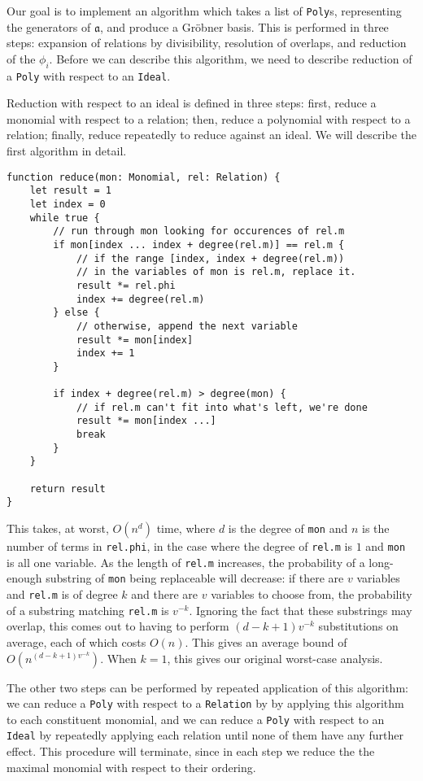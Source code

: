 Our goal is to implement an algorithm which takes a list of \verb|Poly|s, representing the
generators of $\mathfrak{a}$, and produce a Gr\"obner basis. This is performed in three
steps: expansion of relations by divisibility, resolution of overlaps, and reduction
of the $\phi_i$. Before
we can describe this algorithm, we need to describe reduction of a \verb|Poly| with
respect to an \verb|Ideal|.

\begin{alg}
    Reduction with respect to an ideal is defined in three steps: first, reduce
    a monomial with respect to a relation; then, reduce a polynomial with respect
    to a relation; finally, reduce repeatedly to reduce against an ideal. We will
    describe the first algorithm in detail.
\begin{verbatim}
function reduce(mon: Monomial, rel: Relation) {
    let result = 1
    let index = 0
    while true {
        // run through mon looking for occurences of rel.m
        if mon[index ... index + degree(rel.m)] == rel.m {
            // if the range [index, index + degree(rel.m)) 
            // in the variables of mon is rel.m, replace it.
            result *= rel.phi
            index += degree(rel.m)
        } else {
            // otherwise, append the next variable
            result *= mon[index]
            index += 1
        }
        
        if index + degree(rel.m) > degree(mon) {
            // if rel.m can't fit into what's left, we're done
            result *= mon[index ...]
            break
        }
    }
    
    return result
}
\end{verbatim}
    This takes, at worst, $O(n^d)$ time, where $d$ is the
    degree of \verb|mon| and $n$ is the number of terms in \verb|rel.phi|,
    in the case where the degree of \verb|rel.m| is $1$ and \verb|mon| is all one
    variable. As the length of \verb|rel.m| increases, the probability of a long-enough
    substring of \verb|mon| being replaceable will decrease: if there are $v$ variables
    and \verb|rel.m| is of degree $k$ and there are $v$ variables to choose from,
    the probability of a substring matching \verb|rel.m| is $v^{-k}$. Ignoring
    the fact that these substrings may overlap, this comes out to having to perform
    $(d-k+1)v^{-k}$ substitutions on average, each of which costs $O(n)$. This gives
    an average bound of $O(n^{(d-k+1)v^{-k}})$. When $k=1$, this gives our original
    worst-case analysis.
    
    The other two steps can be performed by repeated application of this algorithm:
    we can reduce a \verb|Poly| with respect to a \verb|Relation| by by applying 
    this algorithm to each constituent monomial, and we can reduce a \verb|Poly| with
    respect to an \verb|Ideal| by repeatedly applying each relation until none of them
    have any further effect. This procedure will terminate, since in each step
    we reduce the the maximal monomial with respect to their ordering.
\end{alg}

